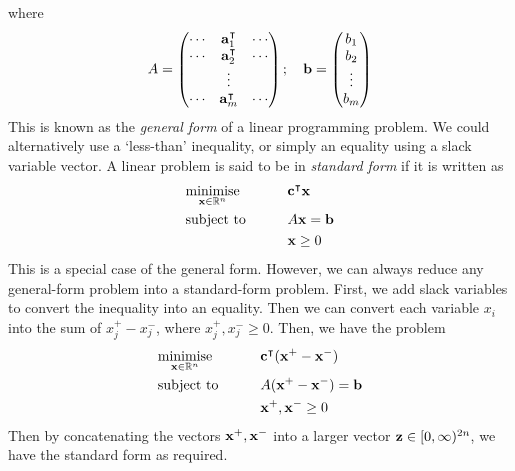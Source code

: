where
\[ A = \begin{pmatrix}
    \cdots & \vb a_1^\intercal & \cdots \\
    \cdots & \vb a_2^\intercal & \cdots \\
    &\vdots& \\
    \cdots & \vb a_m^\intercal & \cdots
\end{pmatrix};\quad \vb b = \begin{pmatrix}
    b_1 \\ b_2 \\ \vdots \\ b_m
\end{pmatrix} \]
This is known as the \textit{general form} of a linear programming problem. We could alternatively use a `less-than' inequality, or simply an equality using a slack variable vector. A linear problem is said to be in \textit{standard form} if it is written as
\begin{alignat*}{2}
    & \underset{\vb x \in \mathbb R^n}{\text{minimise}} & \qquad & \vb c^\intercal \vb x         \\
    & \text{subject to}                                &        & A\vb x = \vb b \\
    & & & \vb x \geq 0
\end{alignat*}
This is a special case of the general form. However, we can always reduce any general-form problem into a standard-form problem. First, we add slack variables to convert the inequality into an equality. Then we can convert each variable \( x_i \) into the sum of \( x_j^+ - x_j^- \), where \( x_j^+, x_j^- \geq 0 \). Then, we have the problem
\begin{alignat*}{2}
    & \underset{\vb x \in \mathbb R^n}{\text{minimise}} & \qquad & \vb c^\intercal (\vb x^+ - \vb x^-)         \\
    & \text{subject to}                                &        & A (\vb x^+ - \vb x^-) = \vb b \\
    & & & \vb x^+, \vb x^- \geq 0
\end{alignat*}
Then by concatenating the vectors \( \vb x^+, \vb x^- \) into a larger vector \( \vb z \in [0, \infty)^{2n} \), we have the standard form as required. %

